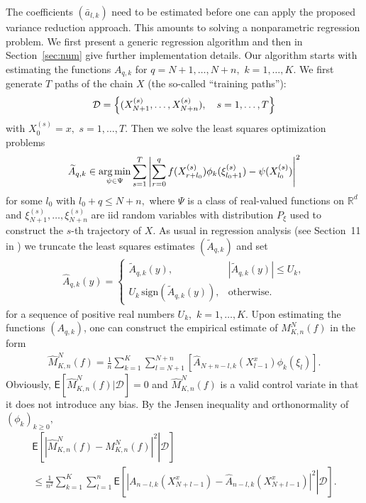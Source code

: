 \documentclass[bj]{imsart}
\def\PE{\mathsf{E}}
\def\NtrainPath{T}
\def\TrainSet{\mathcal{D}}
\newcommand*{\argmin}{\operatornamewithlimits{arg\,min}}
\begin{document}
\par
The coefficients \((\bar a_{l,k})\) need to be estimated before one can apply the proposed variance reduction approach. This amounts to solving a nonparametric regression problem.
We first present a generic regression algorithm and then in Section~\ref{sec:num} give further implementation details. Our algorithm starts with estimating the functions 
$A_{q,k}$ for $q=N+1,\ldots,N+n,$ $k=1,\ldots,K. $ We first generate \(\NtrainPath\)  paths  of the chain \(X\)
(the so-called ``training paths''):
\[
\TrainSet=\Bigl\{(X^{(s)}_{N+1},\ldots,X^{(s)}_{N+n}),\quad s=1,\ldots,\NtrainPath\Bigr\}
\]
with $X^{(s)}_{0}=x,$ $s=1,\ldots,T.$
Then we solve   the least squares optimization problems
\begin{equation}\label{eq:06042018a1}
\widetilde{A}_{q,k} \in \argmin_{\psi \in \Psi} \sum_{s = 1}^{T} \left| \sum_{r = 0}^{q}  f(X_{r+l_0}^{(s)})\phi_k(\xi^{(s)}_{l_0+1}) - \psi(X^{(s)}_{l_0})\right|^2
\end{equation}
for some $l_0$ with $l_0+q\leq N+n,$
where \(\Psi\) is a  class of  real-valued functions on \(\mathbb{R}^d\) and $\xi^{(s)}_{N+1},\ldots,\xi^{(s)}_{N+n}$ are iid random variables with distribution $P_\xi$ used to construct the $s$-th trajectory of $X.$   As usual in regression analysis (see Section~11 in \cite{gyorfi2006distribution})  we  truncate  the least squares estimates $(\widetilde{A}_{q,k})$ and set  
\begin{eqnarray}
\label{eq:trunc}
\widehat{A}_{q,k}(y)=
\begin{cases}
\widetilde{A}_{q,k}(y), & |\widetilde{A}_{q,k}(y)|\leq U_k,
\\
U_k \,\mathrm{sign}(\widetilde{A}_{q,k}(y)), & \mathrm{otherwise}. 
\end{cases}
\end{eqnarray}
 for a sequence of positive real numbers $U_k,$ $k=1,\ldots,K.$
Upon estimating  the functions \((A_{q,k})\), one can construct the empirical estimate  of \(M_{K,n}^N(f)\) in the form
\begin{eqnarray*}
\widehat M_{K,n}^N(f) = \frac{1}{n}\sum_{k=1}^{K}\sum_{l=N+1}^{N+n}\left[\widehat{A}_{N+n-l,k}(X_{l-1}^{x})\phi_{k}(\xi_{l})\right].
\end{eqnarray*}
Obviously, \(\mathsf{E}[\widehat M_{K,n}^N(f)|\TrainSet]=0\) and \(\widehat M_{K,n}^N(f)\) is a valid control variate in that it
does not introduce any bias. By the Jensen inequality and orthonormality of \((\phi_k)_{k\geq 0},\)
\begin{multline*}
\mathsf{E}\left[\left.\left|\widehat{M}_{K,n}^{N}(f)-M_{K,n}^{N}(f)\right|^{2}\right | \TrainSet \right]
\\
\leq \frac{1}{n^2}\sum_{k=1}^{K}\sum_{l=1}^{n}\PE\left[\left.|A_{n-l,k}(X^x_{N+l-1})-\widehat A_{n-l,k}(X^x_{N+l-1})|^2\right | \TrainSet \right].
\end{multline*}
\end{document}
